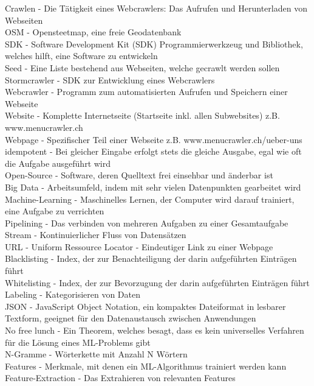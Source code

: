 Crawlen - Die Tätigkeit eines Webcrawlers: Das Aufrufen und Herunterladen von Webseiten\\
OSM - Opensteetmap, eine freie Geodatenbank\\
SDK - Software Development Kit (SDK) Programmierwerkzeug und Bibliothek, welches hilft, eine Software zu entwickeln\\
Seed - Eine Liste bestehend aus Webseiten, welche gecrawlt werden sollen\\
Stormcrawler - SDK zur Entwicklung eines Webcrawlers\\
Webcrawler - Programm zum automatisierten Aufrufen und Speichern einer Webseite\\
Website - Komplette Internetseite (Startseite inkl. allen Subwebsites) z.B. www.menucrawler.ch\\
Webpage - Spezifischer Teil einer Webseite z.B. www.menucrawler.ch/ueber-uns\\
idempotent - Bei gleicher Eingabe erfolgt stets die gleiche Ausgabe, egal wie oft die Aufgabe ausgeführt wird\\
Open-Source - Software, deren Quelltext frei einsehbar und änderbar ist\\
Big Data - Arbeitsumfeld, indem mit sehr vielen Datenpunkten gearbeitet wird\\
Machine-Learning - Maschinelles Lernen, der Computer wird darauf trainiert, eine Aufgabe zu verrichten\\
Pipelining - Das verbinden von mehreren Aufgaben zu einer Gesamtaufgabe\\
Stream - Kontinuierlicher Fluss von Datensätzen\\
URL - Uniform Ressource Locator - Eindeutiger Link zu einer Webpage\\
Blacklisting - Index, der zur Benachteiligung der darin aufgeführten Einträgen führt\\
Whitelisting - Index, der zur Bevorzugung der darin aufgeführten Einträgen führt\\
Labeling - Kategorisieren von Daten\\
JSON - JavaScript Object Notation, ein kompaktes Dateiformat in lesbarer Textform, geeignet für den Datenaustausch zwischen Anwendungen\\
No free lunch - Ein Theorem, welches besagt, dass es kein universelles Verfahren für die Lösung eines ML-Problems gibt\\
N-Gramme - Wörterkette mit Anzahl N Wörtern\\
Features - Merkmale, mit denen ein ML-Algorithmus trainiert werden kann\\
Feature-Extraction - Das Extrahieren von relevanten Features\\